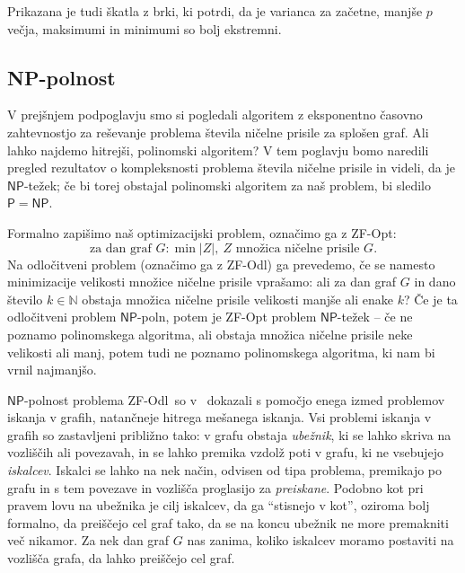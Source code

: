\documentclass[12pt,a4paper,twoside]{article}
\theoremstyle{definition} %
\theoremstyle{plain} %
\numberwithin{equation}{section}  %
\newcommand{\N}{\mathbb N}
\renewcommand{\P}{\ensuremath{\mathsf{P}}}
\newcommand{\NP}{\ensuremath{\mathsf{NP}}}
\newcommand{\ZFOdl}{\textsf{ZF-Odl}}
\begin{document}
Prikazana je tudi škatla z brki, ki potrdi, da je varianca za začetne, manjše $p$ večja, maksimumi in minimumi so bolj ekstremni.

\subsection{NP-polnost}
\label{subsec:np-polnost}

V prejšnjem podpoglavju smo si pogledali algoritem z eksponentno časovno zahtevnostjo za reševanje problema števila ničelne prisile za splošen graf. Ali lahko najdemo hitrejši, polinomski algoritem? V tem poglavju bomo naredili pregled rezultatov o kompleksnosti problema števila ničelne prisile in videli, da je $\NP$-težek; če bi torej obstajal polinomski algoritem za naš problem, bi sledilo $\P = \NP$. 

Formalno zapišimo naš optimizacijski problem, označimo ga z \textsf{ZF-Opt}:
\[ \text{za dan graf } G\colon \min |Z|,\ Z \text{ množica ničelne prisile } G .\]
Na odločitveni problem (označimo ga z \ZFOdl) ga prevedemo, če se namesto minimizacije velikosti množice ničelne prisile vprašamo: ali za dan graf $G$ in dano število $k \in \N$ obstaja množica ničelne prisile velikosti manjše ali enake $k$? Če je ta odločitveni problem $\NP$-poln, potem je \textsf{ZF-Opt} problem $\NP$-težek -- če ne poznamo polinomskega algoritma, ali obstaja množica ničelne prisile neke velikosti ali manj, potem tudi ne poznamo polinomskega algoritma, ki nam bi vrnil najmanjšo. 

$\NP$-polnost problema \ZFOdl\ so v~\cite{fallat2016complexity} dokazali s pomočjo enega izmed problemov iskanja v grafih, natančneje hitrega mešanega iskanja. Vsi problemi iskanja v grafih so zastavljeni približno tako: v grafu obstaja \emph{ubežnik}, ki se lahko skriva na vozliščih ali povezavah, in se lahko premika vzdolž poti v grafu, ki ne vsebujejo \emph{iskalcev}. Iskalci se lahko na nek način, odvisen od tipa problema, premikajo po grafu in s tem povezave in vozlišča proglasijo za \emph{preiskane}. Podobno kot pri pravem lovu na ubežnika je cilj iskalcev, da ga ``stisnejo v kot'', oziroma bolj formalno, da preiščejo cel graf tako, da se na koncu ubežnik ne more premakniti več nikamor. Za nek dan graf $G$ nas zanima, koliko iskalcev moramo postaviti na vozlišča grafa, da lahko preiščejo cel graf. 
\end{document}
